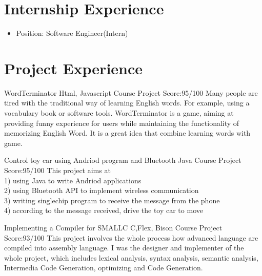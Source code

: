\documentclass[11pt,a4paper]{moderncv}
\begin{document}
\section{Internship Experience}
{
\begin{itemize}
\item Position: Software Engineer(Intern)
\end{itemize}
}

\section{Project Experience}

{WordTerminator}
{Html, Javascript}
{Course Project}
{Score:95/100}
{
Many people are tired with the traditional way of learning English words.
For example, using a vocabulary book or software tools.
WordTerminator is a game, aiming at providing funny experience for users while maintaining the functionality of memorizing English Word.
It is a great idea that combine learning words with game.\\
}

\vspace*{0.2\baselineskip}
{Control toy car using Andriod program and Bluetooth}
{Java}
{Course Project}
{Score:95/100}
{
This project aims at\\
1) using Java to write Andriod applications\\
2) using Bluetooth API to implement wireless communication\\
3) writing singlechip program to receive the message from the phone\\
4) according to the message received, drive the toy car to move\\
}

\vspace*{0.2\baselineskip}
{Implementing a Compiler for SMALLC}
{C,Flex, Bison}
{Course Project}
{Score:93/100}
{
This project involves the whole process how advanced language are compiled into assembly language.
I was the designer and implementer of the whole project, which includes lexical analysis, syntax analysis,
semantic analysis, Intermedia Code Generation, optimizing and Code Generation.\\
}
\end{document}
